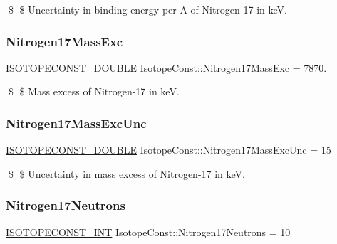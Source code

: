 \$ \$ Uncertainty in binding energy per A of Nitrogen-\/17 in keV. \mbox{\label{group___isotope_const-_nitrogen-_n17_ga345fedbd7aa33e60198ca4ca8eec6518}} 
\subsubsection{\texorpdfstring{Nitrogen17\+Mass\+Exc}{Nitrogen17MassExc}}
{\footnotesize\ttfamily \mbox{\hyperlink{group___isotope_const-_macros_ga8f45a7272ce02c0b4c65c44636ed719a}{I\+S\+O\+T\+O\+P\+E\+C\+O\+N\+S\+T\+\_\+\+D\+O\+U\+B\+LE}} Isotope\+Const\+::\+Nitrogen17\+Mass\+Exc = 7870.}

\$ \$ Mass excess of Nitrogen-\/17 in keV. \mbox{\label{group___isotope_const-_nitrogen-_n17_ga85d1c175a9fe6f394d633f03b77573bb}} 
\subsubsection{\texorpdfstring{Nitrogen17\+Mass\+Exc\+Unc}{Nitrogen17MassExcUnc}}
{\footnotesize\ttfamily \mbox{\hyperlink{group___isotope_const-_macros_ga8f45a7272ce02c0b4c65c44636ed719a}{I\+S\+O\+T\+O\+P\+E\+C\+O\+N\+S\+T\+\_\+\+D\+O\+U\+B\+LE}} Isotope\+Const\+::\+Nitrogen17\+Mass\+Exc\+Unc = 15}

\$ \$ Uncertainty in mass excess of Nitrogen-\/17 in keV. \mbox{\label{group___isotope_const-_nitrogen-_n17_gabeb58414dcce856002885e3542dd3146}} 
\subsubsection{\texorpdfstring{Nitrogen17\+Neutrons}{Nitrogen17Neutrons}}
{\footnotesize\ttfamily \mbox{\hyperlink{group___isotope_const-_macros_ga5f18360b3e99483a35c32d789e62621c}{I\+S\+O\+T\+O\+P\+E\+C\+O\+N\+S\+T\+\_\+\+I\+NT}} Isotope\+Const\+::\+Nitrogen17\+Neutrons = 10}

